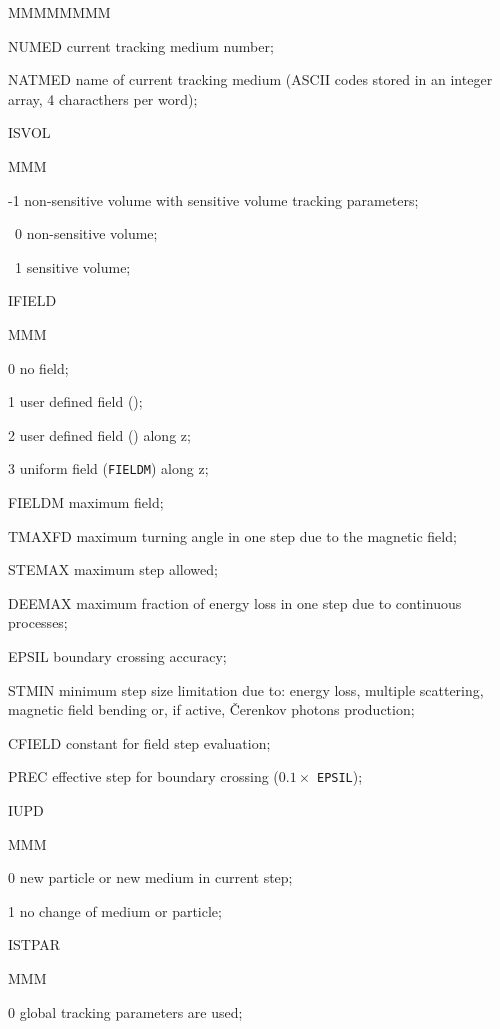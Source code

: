 \begin{DLtt}{MMMMMMMM}
\item[NUMED]  current tracking medium number;
\item[NATMED] name of current tracking medium (ASCII codes stored in an integer
array, 4 characthers per word);
\item[ISVOL]
\begin{DLtt}{MMM}
\item[-1] non-sensitive volume with sensitive volume tracking parameters;
\item[~0] non-sensitive volume;
\item[~1] sensitive volume;
\end{DLtt}
\item[IFIELD]
\begin{DLtt}{MMM}
\item[0] no field;
\item[1] user defined field ();
\item[2] user defined field () along z;
\item[3] uniform field ({\tt FIELDM}) along z;
\end{DLtt}
\item[FIELDM] maximum field;
\item[TMAXFD] maximum turning angle in one step due to the magnetic
field;
\item[STEMAX] maximum step allowed;
\item[DEEMAX] maximum fraction of energy loss in one step due to 
continuous processes;
\item[EPSIL] boundary crossing accuracy;
\item[STMIN] minimum step size limitation due to: energy loss, multiple 
scattering, magnetic field bending or, if active, \v{C}erenkov photons 
production;
\item[CFIELD]constant for field step evaluation;
\item[PREC]effective step for boundary crossing ($0.1 \times$ {\tt EPSIL});
\item[IUPD]
\begin{DLtt}{MMM}
\item[0] new particle or new medium in current step;
\item[1] no change of medium or particle;
\end{DLtt}
\item[ISTPAR]
\begin{DLtt}{MMM}
\item[0] global tracking parameters are used;

\end{DLtt}
\end{DLtt}
